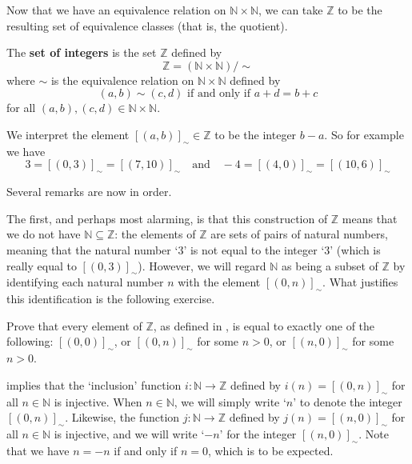 Now that we have an equivalence relation on $\mathbb{N} \times \mathbb{N}$, we can take $\mathbb{Z}$ to be the resulting set of equivalence classes (that is, the quotient).

\begin{construction}
\label{cnsIntegersFromNaturalNumbers}
The \textbf{set of integers} is the set $\mathbb{Z}$ defined by
\[ \mathbb{Z} = (\mathbb{N} \times \mathbb{N})/{\sim} \]
where $\sim$ is the equivalence relation on $\mathbb{N} \times \mathbb{N}$ defined by
\[ (a,b) \sim (c,d) \text{ if and only if } a+d=b+c \]
for all $(a,b),(c,d) \in \mathbb{N} \times \mathbb{N}$.
\end{construction}

We interpret the element $[(a,b)]_{\sim} \in \mathbb{Z}$ to be the integer $b-a$. So for example we have
\[ 3 = [(0,3)]_{\sim} = [(7,10)]_{\sim} \quad \text{and} \quad -4 = [(4,0)]_{\sim} = [(10,6)]_{\sim} \]

Several remarks are now in order.

The first, and perhaps most alarming, is that this construction of $\mathbb{Z}$ means that we do not have $\mathbb{N} \subseteq \mathbb{Z}$: the elements of $\mathbb{Z}$ are sets of pairs of natural numbers, meaning that the natural number `$3$' is not equal to the integer `$3$' (which is really equal to $[(0,3)]_{\sim}$). However, we will regard $\mathbb{N}$ as being a subset of $\mathbb{Z}$ by identifying each natural number $n$ with the element $[(0,n)]_{\sim}$. What justifies this identification is the following exercise.

\begin{exercise}
\label{exRepresentativesOfElementsOfZ}
Prove that every element of $\mathbb{Z}$, as defined in , is equal to exactly one of the following: $[(0,0)]_{\sim}$, or $[(0,n)]_{\sim}$ for some $n>0$, or $[(n,0)]_{\sim}$ for some $n>0$.
\end{exercise}

 implies that the `inclusion' function $i : \mathbb{N} \to \mathbb{Z}$ defined by $i(n) = [(0,n)]_{\sim}$ for all $n \in \mathbb{N}$ is injective. When $n \in \mathbb{N}$, we will simply write `$n$' to denote the integer $[(0,n)]_{\sim}$. Likewise, the function $j : \mathbb{N} \to \mathbb{Z}$ defined by $j(n) = [(n,0)]_{\sim}$ for all $n \in \mathbb{N}$ is injective, and we will write `$-n$' for the integer $[(n,0)]_{\sim}$. Note that we have $n=-n$ if and only if $n=0$, which is to be expected.

